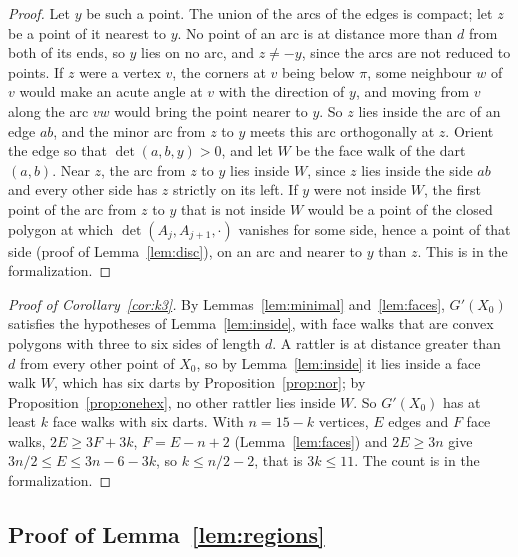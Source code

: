 \documentclass[12pt]{amsart}
\theoremstyle{definition}
\theoremstyle{plain}
\theoremstyle{definition}
\begin{document}
\begin{proof}
Let $y$ be such a point. The union of the arcs of the edges is compact; let $z$ be a point of it nearest to $y$. No point of an arc is at distance more than $d$ from both of its ends, so $y$ lies on no arc, and $z\ne-y$, since the arcs are not reduced to points. If $z$ were a vertex $v$, the corners at $v$ being below $\pi$, some neighbour $w$ of $v$ would make an acute angle at $v$ with the direction of $y$, and moving from $v$ along the arc $vw$ would bring the point nearer to $y$. So $z$ lies inside the arc of an edge $ab$, and the minor arc from $z$ to $y$ meets this arc orthogonally at $z$. Orient the edge so that $\det(a,b,y)>0$, and let $W$ be the face walk of the dart $(a,b)$. Near $z$, the arc from $z$ to $y$ lies inside $W$, since $z$ lies inside the side $ab$ and every other side has $z$ strictly on its left. If $y$ were not inside $W$, the first point of the arc from $z$ to $y$ that is not inside $W$ would be a point of the closed polygon at which $\det(A_j,A_{j+1},\cdot)$ vanishes for some side, hence a point of that side (proof of Lemma~\ref{lem:disc}), on an arc and nearer to $y$ than $z$. This is  in the formalization.
\end{proof}

\begin{proof}[Proof of Corollary~\ref{cor:k3}]
By Lemmas~\ref{lem:minimal} and~\ref{lem:faces}, $G'(X_0)$ satisfies the hypotheses of Lemma~\ref{lem:inside}, with face walks that are convex polygons with three to six sides of length $d$. A rattler is at distance greater than $d$ from every other point of $X_0$, so by Lemma~\ref{lem:inside} it lies inside a face walk $W$, which has six darts by Proposition~\ref{prop:nor}; by Proposition~\ref{prop:onehex}, no other rattler lies inside $W$. So $G'(X_0)$ has at least $k$ face walks with six darts. With $n=15-k$ vertices, $E$ edges and $F$ face walks, $2E\ge3F+3k$, $F=E-n+2$ (Lemma~\ref{lem:faces}) and $2E\ge3n$ give $3n/2\le E\le3n-6-3k$, so $k\le n/2-2$, that is $3k\le11$. The count is  in the formalization.
\end{proof}

\subsection{Proof of Lemma~\ref{lem:regions}}
\end{document}
